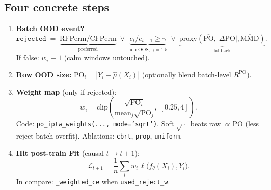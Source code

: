 \documentclass[11pt]{article}
\newcommand{\PO}{\mathrm{PO}}
\begin{document}
\subsection{Four concrete steps}
\begin{enumerate}[leftmargin=1.2em,itemsep=3pt]
  \item \textbf{Batch OOD event?}
        \[
          \texttt{rejected}
          \;=\;
          \underbrace{\mathrm{RFPerm/CFPerm}}_{\text{preferred}}
          \;\lor\;
          \underbrace{e_t/e_{t-1}\ge\gamma}_{\text{hop OOS, }\gamma=1.5}
          \;\lor\;
          \underbrace{\mathrm{proxy}(\overline{\PO},|\Delta\PO|,\overline{\mathrm{MMD}})}_{\text{fallback}}.
        \]
        If false: $w_i\equiv 1$ (calm windows untouched).

  \item \textbf{Row OOD size:}
        $\PO_i=|Y_i-\hat\mu(X_i)|$
        (optionally blend batch-level $R^{\PO}$).

  \item \textbf{Weight map} (only if rejected):
        \[
          w_i
          =
          \mathrm{clip}\!\left(
            \frac{\sqrt{\PO_i}}{\mathrm{mean}_j\sqrt{\PO_j}},\;
            [0.25,4]
          \right).
        \]
        Code: \texttt{po\_iptw\_weights(..., mode='sqrt')}.
        Soft $\sqrt{\,\cdot\,}$ beats raw $\propto\PO$ (less reject-batch
        overfit). Ablations: \texttt{cbrt}, \texttt{prop}, \texttt{uniform}.

  \item \textbf{Hit post-train Fit} (causal $t\to t{+}1$):
        \[
          \mathcal{L}_{t+1}
          =
          \frac1n\sum_i w_i\,\ell\!\big(f_\theta(X_i),Y_i\big).
        \]
        In compare: \texttt{\_weighted\_ce} when \texttt{used\_reject\_w}.
\end{enumerate}
\end{document}
